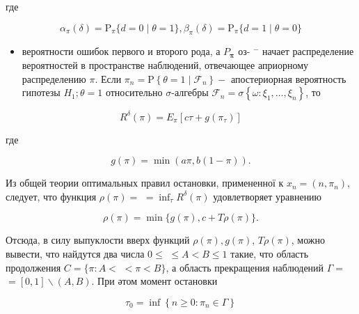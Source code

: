 \documentclass[10pt]{article}
\begin{document}
где



\[

\alpha_{\pi}(\delta)=\mathrm{P}_{\pi}\{d=0 \mid \theta=1\}, \beta_{\pi}(\delta)=\mathrm{P}_{\pi}\{d=1 \mid \theta=0\}

\]



\begin{itemize}

  \item вероятности ошибок первого и второго рода, а $P_{\boldsymbol{\pi}}$ оз- $^{-}$ начает распределение вероятностей в пространстве наблюдений, отвечающее априорному распределению $\pi$. Если $\pi_{n}=\mathrm{P}\left\{\theta=1 \mid \mathscr{F}_{n}\right\}-$ апостериорная вероятность гипотезы $H_{1} ; \theta=1$ относительно $\sigma$-алгебры $\mathscr{F}_{n}=\sigma\left\{\omega: \xi_{1}, \ldots, \xi_{n}\right\}$, то

\end{itemize}



\[

R^{\delta}(\pi)=E_{\pi}\left[c \tau+g\left(\pi_{\tau}\right)\right]

\]



где



\[

g(\pi)=\min (a \pi, b(1-\pi)) .

\]



Из общей теории оптимальных правил остановки, примененної к $x_{n}=\left(n, \pi_{n}\right)$, следует, что функция $\rho(\pi)=$ $=\inf _{\tau} R^{\delta}(\pi)$ удовлетворяет уравнению



\[

\rho(\pi)=\min \{g(\pi), c+T \rho(\pi)\} .

\]



Отсюда, в силу выпуклости вверх функций $\rho(\pi), g(\pi)$, $T \rho(\pi)$, можно вывести, что найдутся два числа $0 \leqslant$ $\leqslant A<B \leqslant 1$ такие, что область продолжения $C=\{\pi: A<$ $<\pi<B\}$, а область прекращения наблюдений $\Gamma=$ $=[0,1] \backslash(A, B)$. При әтом момент остановки



\[

\tau_{0}=\inf \left\{n \geqslant 0: \pi_{n} \in \Gamma\right\}

\]
\end{document}
